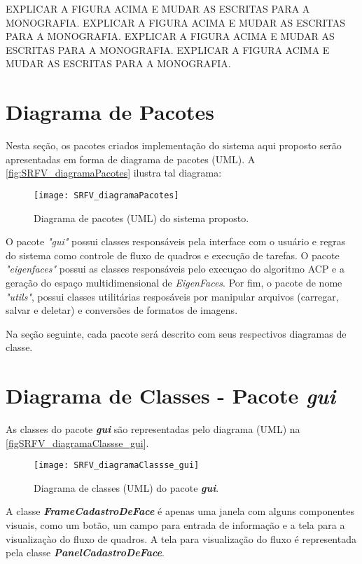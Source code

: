 EXPLICAR A FIGURA ACIMA E MUDAR AS ESCRITAS PARA A MONOGRAFIA.
EXPLICAR A FIGURA ACIMA E MUDAR AS ESCRITAS PARA A MONOGRAFIA.
EXPLICAR A FIGURA ACIMA E MUDAR AS ESCRITAS PARA A MONOGRAFIA.
EXPLICAR A FIGURA ACIMA E MUDAR AS ESCRITAS PARA A MONOGRAFIA.


\section{Diagrama de Pacotes}\label{sec:diagpacs}
Nesta seção, os pacotes criados implementação do sistema aqui proposto serão apresentadas em forma de diagrama de pacotes (UML). A \autoref{fig:SRFV_diagramaPacotes} ilustra tal diagrama:

\begin{figure}[h]
	\centering
	\texttt{[image: SRFV\_diagramaPacotes]}
	\caption{Diagrama de pacotes (UML) do sistema proposto.}
	\label{fig:SRFV_diagramaPacotes}
\end{figure}

O pacote \textit{"gui"} possui classes responsáveis pela interface com o usuário e regras do sistema como controle de fluxo de quadros e execução de tarefas. O pacote \textit{"eigenfaces"} possui as classes responsáveis pelo execuçao do algoritmo ACP e a geração do espaço multidimensional de \textit{EigenFaces}. Por fim, o pacote de nome \textit{"utils"}, possui classes utilitárias resposáveis por manipular arquivos (carregar, salvar e deletar) e conversões de formatos de imagens. 

Na seção seguinte, cada pacote será descrito com seus respectivos diagramas de classe.

\section{Diagrama de Classes - Pacote \textit{\textbf{gui}}}\label{sec:diagclasses}
As classes do pacote \textbf{\textit{gui}} são representadas pelo diagrama (UML) na \autoref{figSRFV_diagramaClassse_gui}.

\begin{figure}[h]
	\centering
	\texttt{[image: SRFV\_diagramaClassse\_gui]}
	\caption{Diagrama de classes (UML) do pacote \textbf{\textit{gui}}.}
	\label{figSRFV_diagramaClassse_gui}
\end{figure}

A classe \textbf{\textit{FrameCadastroDeFace}} é apenas uma janela com alguns componentes visuais, como um botão, um campo para entrada de informação e a tela para a visualizaçào do fluxo de quadros. A tela para visualização do fluxo é representada pela classe \textbf{\textit{PanelCadastroDeFace}}.

